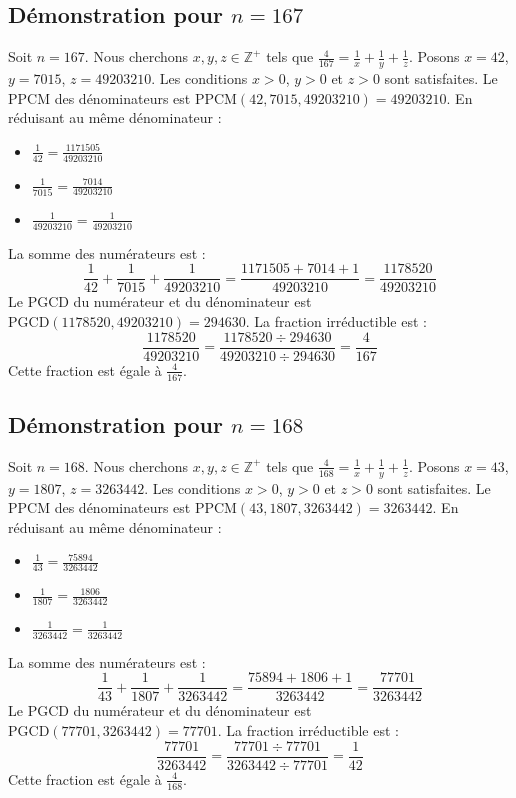 \documentclass[11pt,a4paper]{article}
\begin{document}
\subsection{Démonstration pour $n = 167$}
Soit $n = 167$. Nous cherchons $x, y, z \in \mathbb{Z}^{+}$ tels que $\frac{4}{167} = \frac{1}{x} + \frac{1}{y} + \frac{1}{z}$.
Posons $x = 42$, $y = 7015$, $z = 49203210$.
Les conditions $x > 0$, $y > 0$ et $z > 0$ sont satisfaites.
Le PPCM des dénominateurs est $\text{PPCM}(42, 7015, 49203210) = 49203210$.
En réduisant au même dénominateur :
\begin{itemize}
    \item $\frac{1}{42} = \frac{1171505}{49203210}$
    \item $\frac{1}{7015} = \frac{7014}{49203210}$
    \item $\frac{1}{49203210} = \frac{1}{49203210}$
\end{itemize}
La somme des numérateurs est :
$$ \frac{1}{42} + \frac{1}{7015} + \frac{1}{49203210} = \frac{1171505 + 7014 + 1}{49203210} = \frac{1178520}{49203210} $$
Le PGCD du numérateur et du dénominateur est $\text{PGCD}(1178520, 49203210) = 294630$.
La fraction irréductible est :
$$ \frac{1178520}{49203210} = \frac{1178520 \div 294630}{49203210 \div 294630} = \frac{4}{167} $$
Cette fraction est égale à $\frac{4}{167}$.

\subsection{Démonstration pour $n = 168$}
Soit $n = 168$. Nous cherchons $x, y, z \in \mathbb{Z}^{+}$ tels que $\frac{4}{168} = \frac{1}{x} + \frac{1}{y} + \frac{1}{z}$.
Posons $x = 43$, $y = 1807$, $z = 3263442$.
Les conditions $x > 0$, $y > 0$ et $z > 0$ sont satisfaites.
Le PPCM des dénominateurs est $\text{PPCM}(43, 1807, 3263442) = 3263442$.
En réduisant au même dénominateur :
\begin{itemize}
    \item $\frac{1}{43} = \frac{75894}{3263442}$
    \item $\frac{1}{1807} = \frac{1806}{3263442}$
    \item $\frac{1}{3263442} = \frac{1}{3263442}$
\end{itemize}
La somme des numérateurs est :
$$ \frac{1}{43} + \frac{1}{1807} + \frac{1}{3263442} = \frac{75894 + 1806 + 1}{3263442} = \frac{77701}{3263442} $$
Le PGCD du numérateur et du dénominateur est $\text{PGCD}(77701, 3263442) = 77701$.
La fraction irréductible est :
$$ \frac{77701}{3263442} = \frac{77701 \div 77701}{3263442 \div 77701} = \frac{1}{42} $$
Cette fraction est égale à $\frac{4}{168}$.
\end{document}
